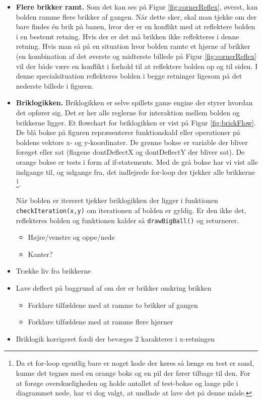 \begin{itemize}
\item \textbf{Flere brikker ramt.} Som det kan ses på Figur \ref{fig:cornerReflex}, øverst, kan bolden ramme flere brikker af gangen. Når dette sker, skal man tjekke om der bare findes én brik på banen, hvor der er en konflikt med at reflektere bolden i en bestemt retning. Hvis der er det må brikken ikke reflekteres i denne retning. Hvis man så på en situation hvor bolden ramte et hjørne af brikker (en kombination af det øverste og midterste billede på Figur \ref{fig:cornerReflex} vil der både være en konflikt i forhold til at reflektere bolden op og til siden. I denne specialsituation reflekteres bolden i begge retninger ligesom på det nederste billede i figuren.


\item \textbf{Briklogikken.} Briklogikken er selve spillets game engine der styrer hvordan det opfører sig. Det er her alle reglerne for interaktion mellem bolden og brikkerne ligger. Et flowchart for briklogikken er vist på Figur \ref{fig:brickFlow}. De blå bokse på figuren repræsenterer funktionskald eller operationer på boldens vektors x- og y-koordinater. De grønne bokse er variable der bliver forøget eller sat (flagene dontDeflectX og dontDeflectY der bliver sat). De orange bokse er tests i form af if-statements. Med de grå bokse har vi vist alle indgange til, og udgange fra, det indlejrede for-loop der tjekker alle brikkerne
\footnote{Da et for-loop egentlig bare er noget kode der køres så længe en test er sand, kunne det tegnes med en orange boks og en pil der fører tilbage til den. For at forøge overskueligheden og holde antallet af test-bokse og lange pile i diagrammet nede, har vi dog valgt, at undlade at lave det på denne måde.}. 

Når bolden er itereret tjekker briklogikken der ligger i funktionen \texttt{checkIteration(x,y)} om iterationen af bolden er gyldig. Er den ikke det, reflekteres bolden og funktionen kalder så \texttt{drawBigBall()} og returnerer. 

\begin{itemize}
\item Højre/venstre og oppe/nede
\item Kanter?
\end{itemize}
\item Trække liv fra brikkerne
\item Lave deflect på baggrund af om der er brikker omkring brikken
\begin{itemize}
\item Forklare tilfældene med at ramme to brikker af gangen
\item Forklare tilfældene med at ramme flere hjørner
\end{itemize}
\item Briklogik korrigeret fordi der bevæges 2 karakterer i x-retningen
\end{itemize}


